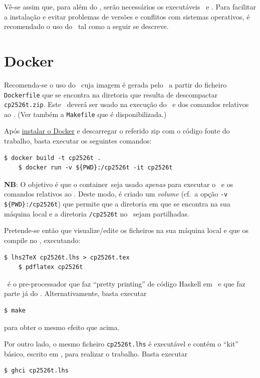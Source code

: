 \documentclass[11pt, a4paper, fleqn]{article}
\begin{document}
        \esquema

Vê-se assim que, para além do \GHCi, serão necessários os executáveis \PdfLatex\ e
\LhsToTeX. Para facilitar a instalação e evitar problemas de versões e
conflitos com sistemas operativos, é recomendado o uso do \Docker\ tal como
a seguir se descreve.

\section{Docker} \label{sec:docker}

Recomenda-se o uso do \container\ cuja imagem é gerada pelo \Docker\ a partir do ficheiro
\texttt{Dockerfile} que se encontra na diretoria que resulta de descompactar
\texttt{cp2526t.zip}. Este \container\ deverá ser usado na execução
do \GHCi\ e dos comandos relativos ao \Latex. (Ver também a \texttt{Makefile}
que é disponibilizada.)

Após \href{https://docs.docker.com/engine/install/}{instalar o Docker} e
descarregar o referido zip com o código fonte do trabalho,
basta executar os seguintes comandos:
\begin{Verbatim}[fontsize=\small]
    $ docker build -t cp2526t .
    $ docker run -v ${PWD}:/cp2526t -it cp2526t
\end{Verbatim}
\textbf{NB}: O objetivo é que o container\ seja usado \emph{apenas} 
para executar o \GHCi\ e os comandos relativos ao \Latex.
Deste modo, é criado um \textit{volume} (cf.\ a opção \texttt{-v \$\{PWD\}:/cp2526t}) 
que permite que a diretoria em que se encontra na sua máquina local 
e a diretoria \texttt{/cp2526t} no \container\ sejam partilhadas.

Pretende-se então que visualize/edite os ficheiros na sua máquina local e que
os compile no \container, executando:
\begin{Verbatim}[fontsize=\small]
    $ lhs2TeX cp2526t.lhs > cp2526t.tex
    $ pdflatex cp2526t
\end{Verbatim}
\LhsToTeX\ é o pre-processador que faz ``pretty printing'' de código Haskell
em \Latex\ e que faz parte já do \container. Alternativamente, basta executar
\begin{Verbatim}[fontsize=\small]
    $ make
\end{Verbatim}
para obter o mesmo efeito que acima.

Por outro lado, o mesmo ficheiro \texttt{cp2526t.lhs} é executável e contém
o ``kit'' básico, escrito em \Haskell, para realizar o trabalho. Basta executar
\begin{Verbatim}[fontsize=\small]
    $ ghci cp2526t.lhs
\end{Verbatim}
\end{document}
